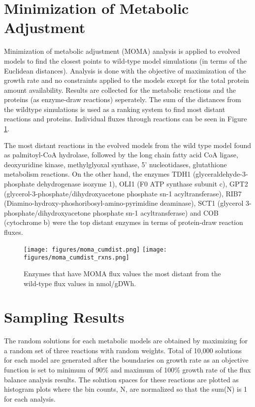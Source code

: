 \section{Minimization of Metabolic Adjustment}

Minimization of metabolic adjustment (MOMA) analysis is applied to evolved models to find the closest points to wild-type model simulations (in terms of the Euclidean distances). Analysis is done with the objective of maximization of the growth rate and no constraints applied to the models except for the total protein amount availability. Results are collected for the metabolic reactions and the proteins (as enzyme-draw reactions) seperately. The sum of the distances from the wildtype simulations is used as a ranking system to find most distant reactions and proteins. Individual fluxes through reactions can be seen in Figure \ref{fig:moma_cumdist}.


 The most distant reactions in the evolved models from the wild type model found as palmitoyl-CoA hydrolase, followed by the long chain fatty acid CoA ligase, deoxyuridine kinase, methylglyoxal synthase, 5' nucleotidases, glutathione metabolism reactions. On the other hand, the enzymes TDH1 (glyceraldehyde-3-phosphate dehydrogenase isozyme 1), OLI1 (F0 ATP synthase subunit c), GPT2 (glycerol-3-phosphate/dihydroxyacetone phosphate sn-1 acyltransferase), RIB7 (Diamino-hydroxy-phoshoribosyl-amino-pyrimidine deaminase), SCT1 (glycerol 3-phosphate/dihydroxyacetone phosphate sn-1 acyltransferase) and COB (cytochrome b) were the top distant enzymes in terms of protein-draw reaction fluxes.

\begin{figure}[H]
  \begin{center}
  \texttt{[image: figures/moma\_cumdist.png]}
  \texttt{[image: figures/moma\_cumdist\_rxns.png]}
  \caption[Enzymes that have MOMA flux values the most distant from the wild-type flux values in nmol/gDWh]{Enzymes that have MOMA flux values the most distant from the wild-type flux values in nmol/gDWh.}
  \label{fig:moma_cumdist}
  \end{center}
\end{figure}

\section{Sampling Results}

The random solutions for each metabolic models are obtained by maximizing  for a random set of three reactions with random weights. Total of 10,000 solutions for each model are generated after the boundaries on growth rate as an objective function is set to minimum of 90\% and maximum of 100\% growth rate of the flux balance analysis results. The solution spaces for these reactions are plotted as histogram plots where the bin counts, N, are normalized so that the sum(N) is 1 for each analysis.

